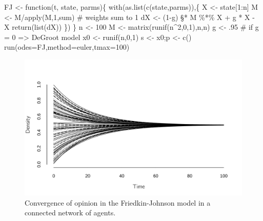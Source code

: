 \documentclass[
  a4paper,
  DIV=11,
  numbers=noendperiod,
  oneside]{scrreprt}
\newenvironment{Shaded}{\begin{snugshade}}{\end{snugshade}}
\newcommand{\AttributeTok}[1]{\textcolor[rgb]{0.40,0.45,0.13}{#1}}
\newcommand{\CommentTok}[1]{\textcolor[rgb]{0.37,0.37,0.37}{#1}}
\newcommand{\ControlFlowTok}[1]{\textcolor[rgb]{0.00,0.23,0.31}{#1}}
\newcommand{\DecValTok}[1]{\textcolor[rgb]{0.68,0.00,0.00}{#1}}
\newcommand{\FunctionTok}[1]{\textcolor[rgb]{0.28,0.35,0.67}{#1}}
\newcommand{\NormalTok}[1]{\textcolor[rgb]{0.00,0.23,0.31}{#1}}
\newcommand{\OtherTok}[1]{\textcolor[rgb]{0.00,0.23,0.31}{#1}}
\newcommand{\SpecialCharTok}[1]{\textcolor[rgb]{0.37,0.37,0.37}{#1}}
\newcommand{\StringTok}[1]{\textcolor[rgb]{0.13,0.47,0.30}{#1}}
\begin{document}
\begin{Shaded}
\begin{Highlighting}[]
\NormalTok{FJ }\OtherTok{\textless{}{-}} \ControlFlowTok{function}\NormalTok{(t, state, parms)\{}
  \FunctionTok{with}\NormalTok{(}\FunctionTok{as.list}\NormalTok{(}\FunctionTok{c}\NormalTok{(state,parms)),\{}
\NormalTok{    X }\OtherTok{\textless{}{-}}\NormalTok{ state[}\DecValTok{1}\SpecialCharTok{:}\NormalTok{n]}
\NormalTok{    M }\OtherTok{\textless{}{-}}\NormalTok{ M}\SpecialCharTok{/}\FunctionTok{apply}\NormalTok{(M,}\DecValTok{1}\NormalTok{,sum) }\CommentTok{\# weights sum to 1}
\NormalTok{    dX }\OtherTok{\textless{}{-}}\NormalTok{ (}\DecValTok{1}\SpecialCharTok{{-}}\NormalTok{g) §}\SpecialCharTok{*}\NormalTok{ M }\SpecialCharTok{\%*\%}\NormalTok{ X  }\SpecialCharTok{+}\NormalTok{ g }\SpecialCharTok{*}\NormalTok{ X }\SpecialCharTok{{-}}\NormalTok{ X}
    \FunctionTok{return}\NormalTok{(}\FunctionTok{list}\NormalTok{(dX))}
\NormalTok{  \})}
\NormalTok{\}}
\NormalTok{n }\OtherTok{\textless{}{-}} \DecValTok{100}
\NormalTok{M }\OtherTok{\textless{}{-}} \FunctionTok{matrix}\NormalTok{(}\FunctionTok{runif}\NormalTok{(n}\SpecialCharTok{\^{}}\DecValTok{2}\NormalTok{,}\DecValTok{0}\NormalTok{,}\DecValTok{1}\NormalTok{),n,n)}
\NormalTok{g }\OtherTok{\textless{}{-}}\NormalTok{ .}\DecValTok{95} \CommentTok{\# if g  = 0 =\textgreater{} DeGroot model}
\NormalTok{x0 }\OtherTok{\textless{}{-}} \FunctionTok{runif}\NormalTok{(n,}\DecValTok{0}\NormalTok{,}\DecValTok{1}\NormalTok{)}
\NormalTok{s }\OtherTok{\textless{}{-}}\NormalTok{ x0;p  }\OtherTok{\textless{}{-}} \FunctionTok{c}\NormalTok{() }
\FunctionTok{run}\NormalTok{(}\AttributeTok{odes=}\NormalTok{FJ,}\AttributeTok{method=}\StringTok{\textquotesingle{}euler\textquotesingle{}}\NormalTok{,}\AttributeTok{tmax=}\DecValTok{100}\NormalTok{)}
\end{Highlighting}
\end{Shaded}

\begin{figure}

{\centering \includegraphics{media/ch7/fig-ch7-img7-old-95.png}

}

\caption{\label{fig-ch7-img7-old-95}Convergence of opinion in the
Friedkin-Johnson model in a connected network of agents.}

\end{figure}
\end{document}
